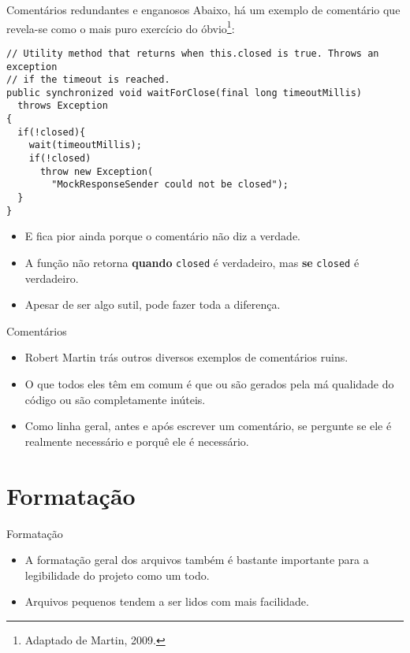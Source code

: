 \documentclass[11pt]{beamer}
\begin{document}
  \begin{frame}[fragile]{Comentários redundantes e enganosos}
    Abaixo, há um exemplo de comentário que revela-se como o mais puro exercício do óbvio\footnote{Adaptado de Martin, 2009.}:
    \begin{lstlisting}
// Utility method that returns when this.closed is true. Throws an exception
// if the timeout is reached.
public synchronized void waitForClose(final long timeoutMillis) 
  throws Exception
{
  if(!closed){
    wait(timeoutMillis);
    if(!closed)
      throw new Exception(
        "MockResponseSender could not be closed");
  }
}
    \end{lstlisting}
    \begin{itemize}
      \item E fica pior ainda porque o comentário não diz a verdade.
      \item A função não retorna \textbf{quando} \verb|closed| é verdadeiro, mas \textbf{se} \verb|closed| é verdadeiro.
      \item Apesar de ser algo sutil, pode fazer toda a diferença.
    \end{itemize}
  \end{frame}

  \begin{frame}{Comentários}
    \begin{itemize}
      \item Robert Martin trás outros diversos exemplos de comentários ruins.
      \item O que todos eles têm em comum é que ou são gerados pela má qualidade do código ou são completamente inúteis.
      \item Como linha geral, antes e após escrever um comentário, se pergunte se ele é realmente necessário e porquê ele é necessário.
    \end{itemize}
  \end{frame}

  \section{Formatação}

  \begin{frame}{Formatação}
    \begin{itemize}
      \item A formatação geral dos arquivos também é bastante importante para a legibilidade do projeto como um todo.
      \item Arquivos pequenos tendem a ser lidos com mais facilidade.
    \end{itemize}
  \end{frame}
\end{document}
